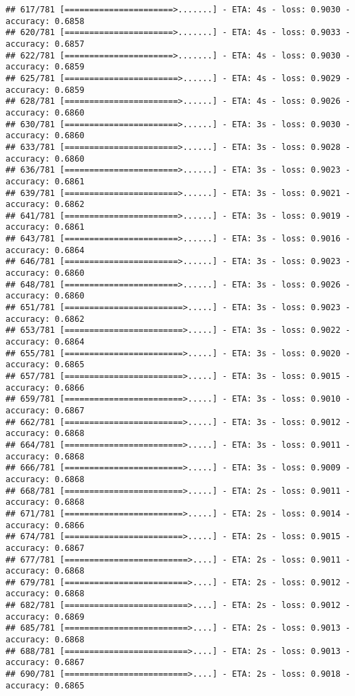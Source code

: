 \documentclass[
]{article}
\begin{document}
\begin{verbatim}
## 617/781 [======================>.......] - ETA: 4s - loss: 0.9030 - accuracy: 0.6858
## 620/781 [======================>.......] - ETA: 4s - loss: 0.9033 - accuracy: 0.6857
## 622/781 [======================>.......] - ETA: 4s - loss: 0.9030 - accuracy: 0.6859
## 625/781 [=======================>......] - ETA: 4s - loss: 0.9029 - accuracy: 0.6859
## 628/781 [=======================>......] - ETA: 4s - loss: 0.9026 - accuracy: 0.6860
## 630/781 [=======================>......] - ETA: 3s - loss: 0.9030 - accuracy: 0.6860
## 633/781 [=======================>......] - ETA: 3s - loss: 0.9028 - accuracy: 0.6860
## 636/781 [=======================>......] - ETA: 3s - loss: 0.9023 - accuracy: 0.6861
## 639/781 [=======================>......] - ETA: 3s - loss: 0.9021 - accuracy: 0.6862
## 641/781 [=======================>......] - ETA: 3s - loss: 0.9019 - accuracy: 0.6861
## 643/781 [=======================>......] - ETA: 3s - loss: 0.9016 - accuracy: 0.6864
## 646/781 [=======================>......] - ETA: 3s - loss: 0.9023 - accuracy: 0.6860
## 648/781 [=======================>......] - ETA: 3s - loss: 0.9026 - accuracy: 0.6860
## 651/781 [========================>.....] - ETA: 3s - loss: 0.9023 - accuracy: 0.6862
## 653/781 [========================>.....] - ETA: 3s - loss: 0.9022 - accuracy: 0.6864
## 655/781 [========================>.....] - ETA: 3s - loss: 0.9020 - accuracy: 0.6865
## 657/781 [========================>.....] - ETA: 3s - loss: 0.9015 - accuracy: 0.6866
## 659/781 [========================>.....] - ETA: 3s - loss: 0.9010 - accuracy: 0.6867
## 662/781 [========================>.....] - ETA: 3s - loss: 0.9012 - accuracy: 0.6868
## 664/781 [========================>.....] - ETA: 3s - loss: 0.9011 - accuracy: 0.6868
## 666/781 [========================>.....] - ETA: 3s - loss: 0.9009 - accuracy: 0.6868
## 668/781 [========================>.....] - ETA: 2s - loss: 0.9011 - accuracy: 0.6868
## 671/781 [========================>.....] - ETA: 2s - loss: 0.9014 - accuracy: 0.6866
## 674/781 [========================>.....] - ETA: 2s - loss: 0.9015 - accuracy: 0.6867
## 677/781 [=========================>....] - ETA: 2s - loss: 0.9011 - accuracy: 0.6868
## 679/781 [=========================>....] - ETA: 2s - loss: 0.9012 - accuracy: 0.6868
## 682/781 [=========================>....] - ETA: 2s - loss: 0.9012 - accuracy: 0.6869
## 685/781 [=========================>....] - ETA: 2s - loss: 0.9013 - accuracy: 0.6868
## 688/781 [=========================>....] - ETA: 2s - loss: 0.9013 - accuracy: 0.6867
## 690/781 [=========================>....] - ETA: 2s - loss: 0.9018 - accuracy: 0.6865

\end{verbatim}
\end{document}
